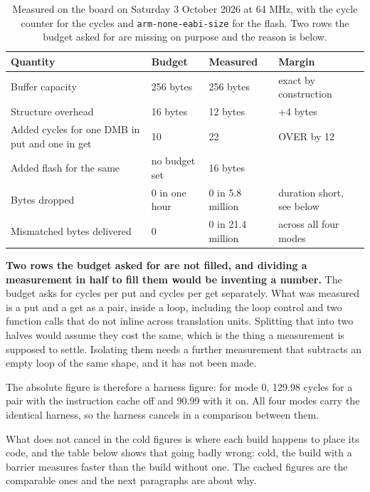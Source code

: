 \begin{table}[H]\centering\small
\begin{tabular}{p{50mm}p{24mm}p{30mm}p{26mm}}
\toprule
Quantity & Budget & Measured & Margin \\
\midrule
Buffer capacity & 256 bytes & 256 bytes & exact by construction \\
Structure overhead & 16 bytes & 12 bytes & +4 bytes \\
Added cycles for one DMB in put and one in get & 10 & 22 & OVER by 12 \\
Added flash for the same & no budget set & 16 bytes & \\
Bytes dropped & 0 in one hour & 0 in 5.8 million & duration short, see below \\
Mismatched bytes delivered & 0 & 0 in 21.4 million & across all four modes \\
\bottomrule
\end{tabular}
\caption{Measured on the board on Saturday 3 October 2026 at 64 MHz, with the cycle counter for the cycles and \texttt{arm-none-eabi-size} for the flash. Two rows the budget asked for are missing on purpose and the reason is below.}
\end{table}

\textbf{Two rows the budget asked for are not filled, and dividing a measurement
in half to fill them would be inventing a number.} The budget asks for cycles per
put and cycles per get separately. What was measured is a put and a get as a pair,
inside a loop, including the loop control and two function calls that do not inline
across translation units. Splitting that into two halves would assume they cost the
same, which is the thing a measurement is supposed to settle. Isolating them needs
a further measurement that subtracts an empty loop of the same shape, and it has
not been made.

The absolute figure is therefore a harness figure: for mode 0, 129.98 cycles for a
pair with the instruction cache off and 90.99 with it on. All four modes carry the
identical harness, so the harness cancels in a comparison between them.

What does not cancel in the cold figures is where each build happens to place its
code, and the table below shows that going badly wrong: cold, the build with a
barrier measures faster than the build without one. The cached figures are the
comparable ones and the next paragraphs are about why.

